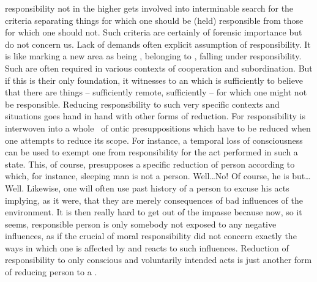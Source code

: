 \pa {} responsibility not  in the higher
 gets involved into interminable search for the criteria
separating things for which one should be (held) responsible from those for
which one should not.  Such criteria are certainly of forensic importance but do
not concern us. Lack of  demands often explicit assumption
of responsibility. It is like marking a new area as being , belonging
to , falling under  responsibility. Such  are often
required in various contexts of cooperation and subordination. But if this is
their only foundation, it witnesses to an  which is sufficiently
 to believe that there are things -- sufficiently remote,
sufficiently  -- for which one might not be responsible. Reducing
responsibility to such very specific contexts and situations goes hand in hand
with other forms of reduction. For responsibility is interwoven into a whole
\nexus\ of ontic presuppositions which have to be reduced when one attempts to
reduce its scope. For
instance, a temporal loss of consciousness can be used to exempt one from
responsibility for the act performed in such a state. This, of course,
presupposes a specific reduction of person according to which, for instance,
sleeping man is not a person. Well\ldots No! Of course, he is but\ldots Well.
Likewise, one will often use past history of a person to excuse his acts
implying, as it were, that they are merely consequences of bad influences of the
environment. It is then really hard to get out of the impasse because now, so it
seems, responsible person is only somebody not exposed to any negative
influences, as if the crucial  of moral responsibility did not concern
exactly the ways in which one is affected by and reacts to such influences.
Reduction of responsibility to only conscious and voluntarily intended acts is
just another form of reducing person to a .

